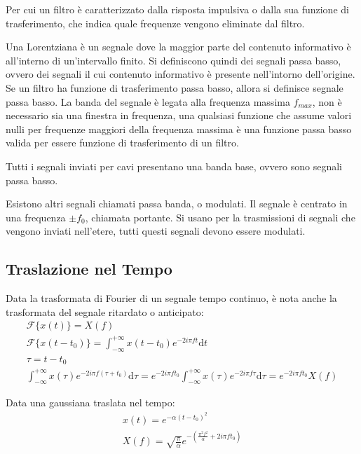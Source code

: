 \documentclass{article}
\newcommand{\df}{\mathrm{d}}
\numberwithin{equation}{subsection}
\begin{document}
Per cui un filtro è caratterizzato dalla risposta impulsiva o dalla sua funzione di trasferimento, che indica quale frequenze vengono eliminate dal filtro. 




Una Lorentziana è un segnale dove la maggior parte del contenuto informativo è all'interno di un'intervallo finito. Si definiscono quindi dei segnali passa basso, 
ovvero dei segnali il cui contenuto informativo è presente nell'intorno dell'origine. Se un filtro ha funzione di trasferimento passa basso, allora si definisce segnale 
passa basso. La banda del segnale è legata alla frequenza massima $f_{max}$, non è necessario sia una finestra in frequenza, una qualsiasi funzione che assume valori nulli 
per frequenze maggiori della frequenza massima è una funzione passa basso valida per essere funzione di trasferimento di un filtro. 

Tutti i segnali inviati per cavi presentano una banda base, ovvero sono segnali passa basso. 


Esistono altri segnali chiamati passa banda, o modulati. Il segnale è centrato in una frequenza $\pm f_0$, chiamata portante. Si usano per la trasmissioni di segnali 
che vengono inviati nell'etere, tutti questi segnali devono essere modulati. 

\subsection{Traslazione nel Tempo}

Data la trasformata di Fourier di un segnale tempo continuo, è nota anche la trasformata del segnale ritardato o anticipato:
\begin{gather*}
    \mathscr{F}\{x(t)\}=X(f)\\
    \mathscr{F}\{x(t-t_0)\}=\displaystyle\int_{-\infty}^{+\infty}x(t-t_0)e^{-2i\pi ft}\df t\\
    \tau=t-t_0\\
    \displaystyle\int_{-\infty}^{+\infty}x(\tau)e^{-2i\pi f(\tau+t_0)}\df\tau=e^{-2i\pi ft_0}\int_{-\infty}^{+\infty}x(\tau)e^{-2i\pi f\tau}\df\tau=e^{-2i\pi ft_0}X(f)
\end{gather*}

Data una gaussiana traslata nel tempo:
\begin{gather*}
    x(t)=e^{-\alpha(t-t_0)^2}\\
    X(f)=\displaystyle\sqrt{\frac{\pi}{\alpha}}e^{-\left(\frac{\pi^2f^2}{\alpha}+2i\pi ft_0\right)}
\end{gather*}
\end{document}
